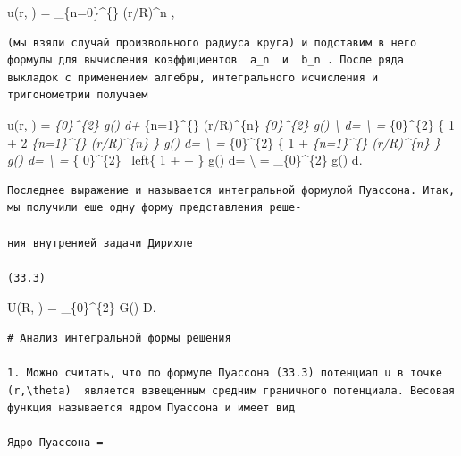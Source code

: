 \documentclass[
  ukrainian,
]{article}
\begin{document}
u(r, \theta) = \sum\_\{n=0\}\^{}\{\infty\} (r/R)\^{}n
,

\begin{verbatim}
(мы взяли случай произвольного радиуса круга) и подставим в него формулы для вычисления коэффициентов  a_n  и  b_n . После ряда выкладок с применением алгебры, интегрального исчисления и тригонометрии получаем
\end{verbatim}

u(r, \theta) =  \int\emph{\{0\}\^{}\{2\pi\} g(\theta)
d\theta +  \sum}\{n=1\}\^{}\{\infty\} (r/R)\^{}\{n\}
\int\emph{\{0\}\^{}\{2\pi\} g(\alpha) \times \textbackslash{}
 d\alpha =
\textbackslash{} =  \int}\{0\}\^{}\{2\pi\} \left\{ 1 + 2
\sum\emph{\{n=1\}\^{}\{\infty\} (r/R)\^{}\{n\}
 \right\} g(\alpha) d\alpha = \textbackslash{} =
 \int}\{0\}\^{}\{2\pi\} \left\{ 1 +
\sum\emph{\{n=1\}\^{}\{\infty\} (r/R)\^{}\{n\}
 \right\}
g(\alpha) d\alpha = \textbackslash{} =  \int}\{
0\}\^{}\{2\pi\} ~left\{ 1 +
+
\right\} g(\alpha) d\alpha = \textbackslash{} = 
\int\_\{0\}\^{}\{2\pi\}
 g(\alpha)
d\alpha.

\begin{verbatim}
Последнее выражение и называется интегральной формулой Пуассона. Итак, мы получили еще одну форму представления реше-

ния внутренией задачи Дирихле

(33.3)
\end{verbatim}

U(R, \theta) =  \int\_\{0\}\^{}\{2\pi\}
 G(\alpha)
D\alpha.

\begin{verbatim}
# Анализ интегральной формы решения

1. Можно считать, что по формуле Пуассона (33.3) потенциал u в точке  (r,\theta)  является взвещенным средним граничного потенциала. Весовая функция называется ядром Пуассона и имеет вид

Ядро Пуассона =
\end{verbatim}
\end{document}
